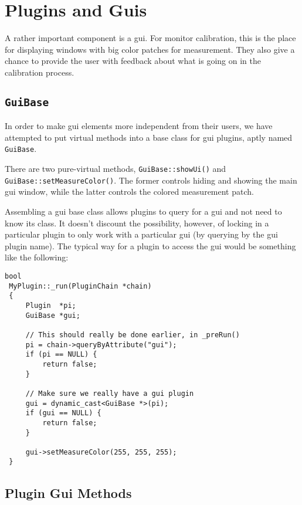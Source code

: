 \section{Plugins and Guis}

A rather important component is a gui. For monitor calibration,
this is the place for displaying windows with big color patches
for measurement. They also give a chance to provide the user 
with feedback about what is going on in the calibration process.

\subsection{\tt GuiBase}

In order to make gui elements more independent from their users, 
we have attempted to put virtual methods into a base class for 
gui plugins, aptly named {\tt GuiBase}. 

There are two pure-virtual methods, {\tt GuiBase::showUi()} and
{\tt GuiBase::setMeasureColor()}. The former controls hiding and
showing the main gui window, while the latter controls the 
colored measurement patch.

Assembling a gui base class allows plugins to query for a gui and
not need to know its class. It doesn't discount the possibility, 
however, of locking in a particular plugin to only work with 
a particular gui (by querying by the gui plugin name). The typical
way for a plugin to access the gui would be something like the
following:

\begin{lstlisting}[frame=single]
 bool
 MyPlugin::_run(PluginChain *chain) 
 {
     Plugin  *pi;
     GuiBase *gui; 

     // This should really be done earlier, in _preRun()
     pi = chain->queryByAttribute("gui");
     if (pi == NULL) {
         return false;
     }

     // Make sure we really have a gui plugin
     gui = dynamic_cast<GuiBase *>(pi);
     if (gui == NULL) {
         return false;
     }

     gui->setMeasureColor(255, 255, 255);
 }
\end{lstlisting}


\subsection{Plugin Gui Methods}

